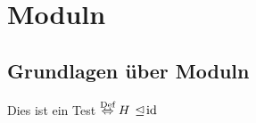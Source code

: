 \newpage
\section{Moduln}
\subsection{Grundlagen über Moduln}
\begin{df}
	Dies ist ein Test $\defi H$ $\norm \id$
\end{df}

	